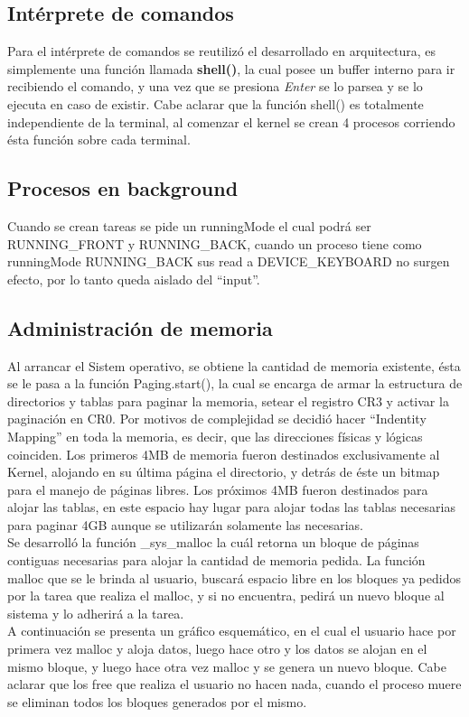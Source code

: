 \documentclass[a4paper,10pt]{article}
\begin{document}
\subsection{Intérprete de comandos}
Para el intérprete de comandos se reutilizó el desarrollado en arquitectura, es simplemente una función llamada \textbf{shell()}, la
cual posee un buffer interno para ir recibiendo el comando, y una vez que se presiona \textit{Enter} se lo parsea y se lo ejecuta en caso
de existir. Cabe aclarar que la función shell() es totalmente independiente de la terminal, al comenzar el kernel se crean 4 procesos
corriendo ésta función sobre cada terminal.


\subsection{Procesos en background}
Cuando se crean tareas se pide un runningMode el cual podrá ser RUNNING\_FRONT y RUNNING\_BACK, cuando un proceso tiene como runningMode 
RUNNING\_BACK sus read a DEVICE\_KEYBOARD no surgen efecto, por lo tanto queda aislado del ``input''.


\subsection{Administración de memoria}
Al arrancar el Sistem operativo, se obtiene la cantidad de memoria existente, ésta se le pasa a la función Paging.start(), la cual se encarga de
armar la estructura de directorios y tablas para paginar la memoria, setear el registro CR3 y activar la paginación en CR0. Por motivos
de complejidad se decidió hacer ``Indentity Mapping'' en toda la memoria, es decir, que las direcciones físicas y lógicas coinciden.
Los primeros 4MB de memoria fueron destinados exclusivamente al Kernel, alojando en su última página el directorio, y detrás de éste un bitmap para
el manejo de páginas libres. Los próximos 4MB fueron destinados para alojar las tablas, en este espacio hay lugar para alojar todas las tablas necesarias
para paginar 4GB aunque se utilizarán solamente las necesarias.\\
Se desarrolló la función \_sys\_malloc la cuál retorna un bloque de páginas contiguas necesarias para alojar la cantidad de memoria pedida. La función malloc
que se le brinda al usuario, buscará espacio libre en los bloques ya pedidos por la tarea que realiza el malloc, y si no encuentra, pedirá un nuevo bloque
al sistema y lo adherirá a la tarea.\\
\noindent A continuación se presenta un gráfico esquemático, en el cual el usuario hace por primera vez malloc y aloja datos, luego hace otro y los datos se
alojan en el mismo bloque, y luego hace otra vez malloc y se genera un nuevo bloque. Cabe aclarar que los free que realiza el usuario no hacen nada, cuando
el proceso muere se eliminan todos los bloques generados por el mismo.
\end{document}
